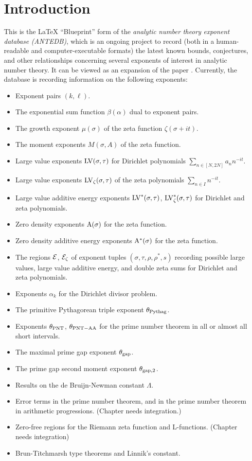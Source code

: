\chapter{Introduction}\label{intro-chapter}

This is the LaTeX ``Blueprint'' form of the \emph{analytic number theory exponent database (ANTEDB)}, which is an ongoing project to record (both in a human-readable and computer-executable formats) the latest known bounds, conjectures, and other relationships concerning several exponents of interest in analytic number theory.  It can be viewed as an expansion of the paper \cite{trudgian-yang}. Currently, the database is recording information on the following exponents:

\begin{itemize}
\item Exponent pairs $(k,\ell)$.
\item The exponential sum function $\beta(\alpha)$ dual to exponent pairs.
\item The growth exponent $\mu(\sigma)$ of the zeta function $\zeta(\sigma+it)$.
\item The moment exponents $M(\sigma,A)$ of the zeta function.
\item Large value exponents $\mathrm{LV}(\sigma, \tau)$ for Dirichlet polynomials $\sum_{n \in [N,2N]} a_n n^{-it}$.
\item Large value exponents $\mathrm{LV}_\zeta(\sigma, \tau)$ of the zeta polynomials $\sum_{n \in I} n^{-it}$.
\item Large value additive energy exponents $\mathrm{LV}^*(\sigma, \tau)$, $\mathrm{LV}^*_\zeta(\sigma, \tau)$ for Dirichlet and zeta polynomials.
\item Zero density exponents $\mathrm{A}(\sigma)$ for the zeta function.
\item Zero density additive energy exponents $\mathrm{A}^*(\sigma)$ for the zeta function.
\item The regions $\mathcal{E}$, $\mathcal{E}_\zeta$ of exponent tuples $(\sigma,\tau,\rho,\rho^*,s)$ recording possible large values, large value additive energy, and double zeta sums for Dirichlet and zeta polynomials.
\item Exponents $\alpha_k$ for the Dirichlet divisor problem.
\item The primitive Pythagorean triple exponent $\theta_{\mathrm{Pythag}}$.
\item Exponents $\theta_{\mathrm{PNT}}$, $\theta_{\mathrm{PNT-AA}}$ for the prime number theorem in all or almost all short intervals.
\item The maximal prime gap exponent $\theta_{\mathrm{gap}}$.
\item The prime gap second moment exponent $\theta_{\mathrm{gap},2}$.
\item Results on the de Bruijn-Newman constant $\Lambda$.
\item Error terms in the prime number theorem, and in the prime number theorem in arithmetic progressions.  (Chapter needs integration.)
\item Zero-free regions for the Riemann zeta function and L-functions.  (Chapter needs integration)
\item Brun-Titchmarsh type theorems and Linnik's constant.
\end{itemize}


